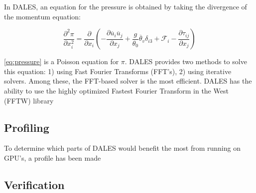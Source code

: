 In DALES, an equation for the pressure is obtained by taking the divergence of the momentum equation:

\begin{equation}
    \frac{\partial^2 \pi}{\partial x_i^2} = \frac{\partial }{\partial x_i} \left( - \frac{\partial \overline{u}_i \overline{u}_j}{\partial x_j} + \frac{g}{\theta_0}\overline{\theta}_v\delta_{i3} + \mathcal{F}_i - \frac{\partial \tau_{ij}}{\partial x_j} \right) \label{eq:pressure}
\end{equation}

\noindent \autoref{eq:pressure} is a Poisson equation for $\pi$. DALES provides two methods to solve this equation: 1) using Fast Fourier Transforms (FFT's), 2) using iterative solvers. Among these, the FFT-based solver is the most efficient. DALES has the ability to use the highly optimized Fastest Fourier Transform in the West (FFTW) library 

\subsection{Profiling}
To determine which parts of DALES would benefit the most from running on GPU's, a profile has been made 

\subsection{Verification}
